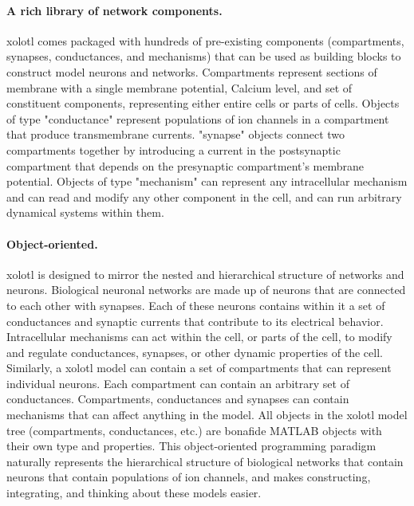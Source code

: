 \documentclass{frontiersSCNS} %
\begin{document}
\paragraph{A rich library of network components.} xolotl comes packaged with hundreds of pre-existing components (compartments, synapses, conductances, and mechanisms) that can be used as building blocks to construct model neurons and networks. Compartments represent sections of membrane with a single membrane potential, Calcium level, and set of constituent components, representing either entire cells or parts of cells. Objects of type "conductance" represent populations of ion channels in a compartment that produce transmembrane currents. "synapse" objects connect two compartments together by introducing a current in the postsynaptic compartment that depends on the presynaptic compartment's membrane potential. Objects of type "mechanism" can represent any intracellular mechanism and can read and modify any other component in the cell, and can run arbitrary dynamical systems within them.

\paragraph{Object-oriented.}
xolotl is designed to mirror the nested and hierarchical structure of networks and neurons. Biological neuronal networks are made up of neurons that are connected to each other with synapses. Each of these neurons contains within it a set of conductances and synaptic currents that contribute to its electrical behavior. Intracellular mechanisms can act within the cell, or parts of the cell, to modify and regulate conductances, synapses, or other dynamic properties of the cell. Similarly, a xolotl model can contain a set of compartments that can represent individual neurons. Each compartment can contain an arbitrary set of conductances. Compartments, conductances and synapses can contain mechanisms that can affect anything in the model. All objects in the xolotl model tree (compartments, conductances, etc.) are bonafide MATLAB objects with their own type and properties. This object-oriented programming paradigm naturally represents the hierarchical structure of biological networks that contain neurons that contain populations of ion channels, and makes constructing, integrating, and thinking about these models easier.
\end{document}
